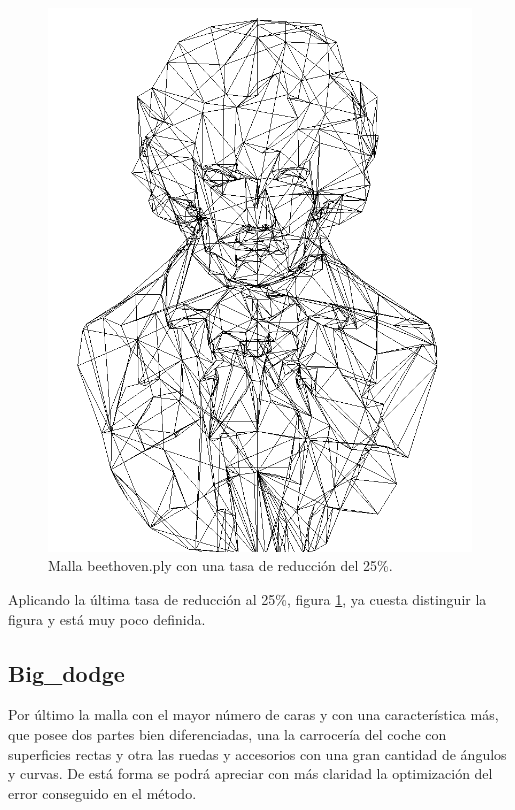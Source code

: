 \begin{figure} %
	\centering
	\includegraphics[scale=0.25]{imagenes/beethoven_25.png} 
	\caption{Malla beethoven.ply con una tasa de reducción del 25\%.} \label{fig:beethoven_25.png}
\end{figure}

Aplicando la última tasa de reducción al 25\%, figura \ref{fig:beethoven_25.png}, ya cuesta distinguir la figura y está muy poco definida.

\subsection{Big\_dodge}
Por último la malla con el mayor número de caras y con una característica más, que posee dos partes bien diferenciadas, una la carrocería del coche con superficies rectas y otra las ruedas y accesorios con una gran cantidad de ángulos y curvas. De está forma se podrá apreciar con más claridad la optimización del error conseguido en el método.\\

